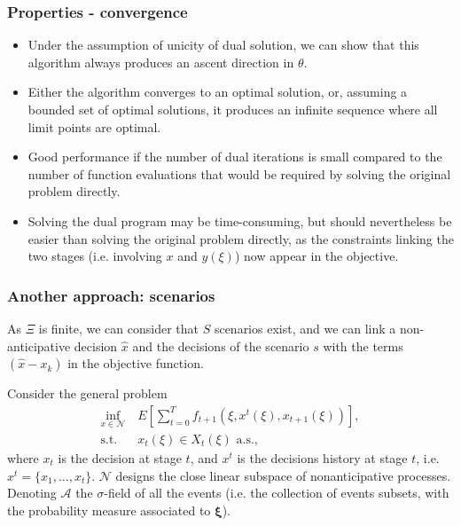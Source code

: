 \documentclass[french]{beamer}
\def\bxi{\boldsymbol\xi}
\begin{document}
\begin{frame}
\frametitle{Properties - convergence}

\begin{itemize}
\item
Under the assumption of unicity of dual solution, we can show that this algorithm always produces an {\blue ascent direction} in $\theta$.
\item
Either the algorithm converges to an optimal solution, or, assuming a bounded set of optimal solutions, it produces an infinite sequence where all limit points are optimal.
\item
Good performance if the number of dual iterations is small compared to the number of function evaluations that would be required by solving the original problem directly.
\item
Solving the dual program may be time-consuming, but should nevertheless be easier than solving the original problem directly, as the constraints linking the two stages (i.e. involving $x$ and $y(\xi)$) now appear in the objective.
\end{itemize}

\end{frame}

\begin{frame}

\frametitle{Another approach: scenarios}

As $\Xi$ is finite, we can consider that $S$ scenarios exist, and we can link a non-anticipative decision $\hat{x}$ and the decisions of the scenario $s$ with the terms $(\hat{x}-x_k)$ in the objective function.

\mbox{}

Consider the general problem
\begin{align*}
\inf_{x \in \mathcal{N}}\ & E \left[ \sum_{t=0}^T f_{t+1}(\xi, x^t(\xi),
x_{t+1}(\xi)) \right], \\
\mbox{s.t. } & x_t(\xi) \in X_t(\xi) \mbox{ a.s.},
\end{align*}
where $x_t$ is the decision at stage $t$, and $x^t$ is the decisions history at stage $t$, i.e. $x^t = \lbrace x_1,\ldots, x_t \rbrace$.
$\mathcal{N}$ designs the close linear subspace of nonanticipative processes.
Denoting $\mathcal{A}$ the $\sigma$-field of all the events (i.e. the collection of events subsets, with the probability measure associated to $\bxi$).

\end{frame}
\end{document}
